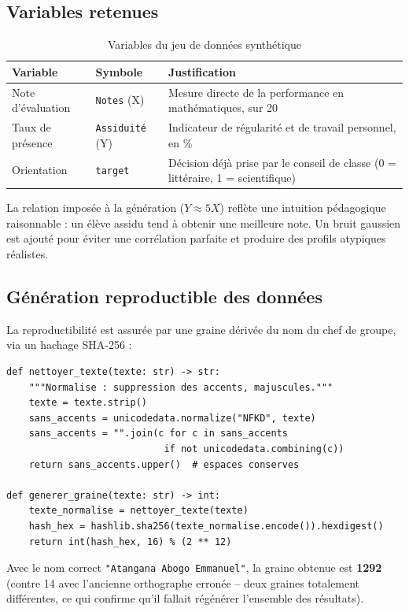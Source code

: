 \documentclass[11pt,a4paper]{article}
\begin{document}
\subsection{Variables retenues}

\begin{table}[H]
\centering
\begin{tabular}{|l|l|p{7cm}|}
\hline
\textbf{Variable} & \textbf{Symbole} & \textbf{Justification} \\
\hline
Note d'évaluation & \texttt{Notes} (X) & Mesure directe de la performance en mathématiques, sur 20 \\
Taux de présence & \texttt{Assiduité} (Y) & Indicateur de régularité et de travail personnel, en \% \\
Orientation & \texttt{target} & Décision déjà prise par le conseil de classe (0 = littéraire, 1 = scientifique) \\
\hline
\end{tabular}
\caption{Variables du jeu de données synthétique}
\end{table}

La relation imposée à la génération ($Y \approx 5X$) reflète une intuition pédagogique
raisonnable : un élève assidu tend à obtenir une meilleure note. Un bruit gaussien est
ajouté pour éviter une corrélation parfaite et produire des profils atypiques réalistes.

\subsection{Génération reproductible des données}

La reproductibilité est assurée par une graine dérivée du nom du chef de groupe, via un
hachage SHA-256 :

\begin{lstlisting}
def nettoyer_texte(texte: str) -> str:
    """Normalise : suppression des accents, majuscules."""
    texte = texte.strip()
    sans_accents = unicodedata.normalize("NFKD", texte)
    sans_accents = "".join(c for c in sans_accents
                            if not unicodedata.combining(c))
    return sans_accents.upper()  # espaces conserves

def generer_graine(texte: str) -> int:
    texte_normalise = nettoyer_texte(texte)
    hash_hex = hashlib.sha256(texte_normalise.encode()).hexdigest()
    return int(hash_hex, 16) % (2 ** 12)
\end{lstlisting}

Avec le nom correct \texttt{"Atangana Abogo Emmanuel"}, la graine obtenue est
\textbf{1292} (contre 14 avec l'ancienne orthographe erronée -- deux graines totalement
différentes, ce qui confirme qu'il fallait régénérer l'ensemble des résultats).
\end{document}
